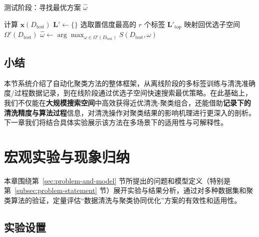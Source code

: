 \documentclass[10pt]{article} %
\numberwithin{equation}{section}
\begin{document}
\begin{algorithm}[t]
\caption{测试阶段：寻找最优方案 \(\hat{\omega}\)}
\label{alg:test-phase}

计算 $\mathbf{x}(D_{\text{test}})$\;
$\mathbf{L}' \leftarrow \{\}$\;
选取置信度最高的 $r$ 个标签 $\mathbf{L}'_{\mathrm{top}}$\;
映射回优选子空间 $\Omega'(D_{\text{test}})$\;
$\hat{\omega} \leftarrow \arg\max_{\omega \in \Omega'(D_{\text{test}})}S(D_{\text{test}}, \omega)$\;
\KwRet{$\hat{\omega}$}
\end{algorithm}

\subsection{小结}
本节系统介绍了自动化聚类方法的整体框架，从离线阶段的多标签训练与清洗准确度/过程数据记录，到在线阶段通过优选子空间快速搜索最优策略。在此基础上，我们不仅能在\textbf{大规模搜索空间}中高效获得近优清洗-聚类组合，还能借助\textbf{记录下的清洗精度与算法过程}信息，对清洗操作对聚类结果的影响机理进行更深入的剖析。下一章我们将结合具体实验展示该方法在多场景下的适用性与可解释性。



\section{宏观实验与现象归纳}
\label{sec:chapter5}

本章围绕第~\ref{sec:problem-and-model} 节所提出的问题和模型定义（特别是第~\ref{subsec:problem-statement} 节）展开实验与结果分析，通过对多种数据集和聚类算法的验证，定量评估“数据清洗与聚类协同优化”方案的有效性和适用性。
\vspace{-0.5em}
\subsection{\textcolor[rgb]{0.00,0.07,1.00}{实验设置}}\label{sec:exp_setting}
\end{document}
